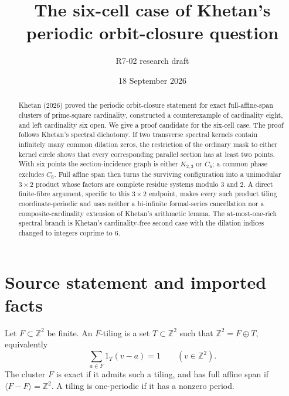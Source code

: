 \documentclass[11pt]{article}
\title{The six-cell case of Khetan's periodic orbit-closure question}
\author{R7-02 research draft}
\date{18 September 2026}
\newcommand{\Z}{\mathbb Z}
\begin{document}
\maketitle

\begin{abstract}
Khetan (2026) proved the periodic orbit-closure statement for exact full-affine-span clusters of prime-square cardinality, constructed a counterexample of cardinality eight, and left cardinality six open. We give a proof candidate for the six-cell case. The proof follows Khetan's spectral dichotomy. If two transverse spectral kernels contain infinitely many common dilation zeros, the restriction of the ordinary mask to either kernel circle shows that every corresponding parallel section has at least two points. With six points the section-incidence graph is either $K_{2,3}$ or $C_6$; a common phase excludes $C_6$. Full affine span then turns the surviving configuration into a unimodular $3\times2$ product whose factors are complete residue systems modulo $3$ and $2$. A direct finite-fibre argument, specific to this $3\times2$ endpoint, makes every such product tiling coordinate-periodic and uses neither a bi-infinite formal-series cancellation nor a composite-cardinality extension of Khetan's arithmetic lemma. The at-most-one-rich spectral branch is Khetan's cardinality-free second case with the dilation indices changed to integers coprime to $6$.
\end{abstract}

\section{Source statement and imported facts}
Let $F\subset\Z^2$ be finite. An $F$-tiling is a set $T\subset\Z^2$ such that $\Z^2=F\oplus T$, equivalently
\[
  \sum_{a\in F}1_T(v-a)=1 \qquad(v\in\Z^2).
\]
The cluster $F$ is exact if it admits such a tiling, and has full affine span if $\langle F-F\rangle=\Z^2$. A tiling is one-periodic if it has a nonzero period.
\end{document}
